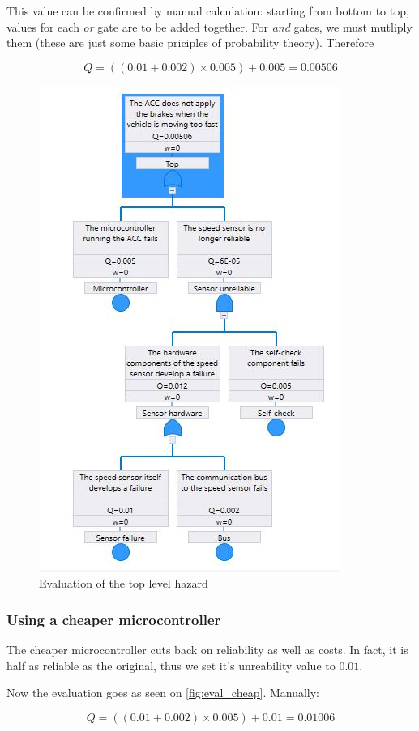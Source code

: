 \documentclass[a4paper]{article}
\begin{document}
This value can be confirmed by manual calculation: starting from bottom to top,
values for each \emph{or} gate are to be added together. For \emph{and} gates,
we must mutliply them (these are just some basic priciples of probability
theory). Therefore

\[ Q = \left((0.01 + 0.002) \times 0.005\right) + 0.005 = 0.00506 \]

\begin{figure}
	\centering
	\includegraphics[width=.5\textwidth]{eval_original.jpg}
	\caption{Evaluation of the top level hazard}%
	\label{fig:eval_original}
\end{figure}

\subsubsection{Using a cheaper microcontroller}

The cheaper microcontroller cuts back on reliability as well as costs. In fact,
it is half as reliable as the original, thus we set it's unreability value to
\(0.01\).

Now the evaluation goes as seen on \cref{fig:eval_cheap}. Manually:

\[ Q = \left((0.01 + 0.002) \times 0.005\right) + 0.01 = 0.01006 \]
\end{document}
